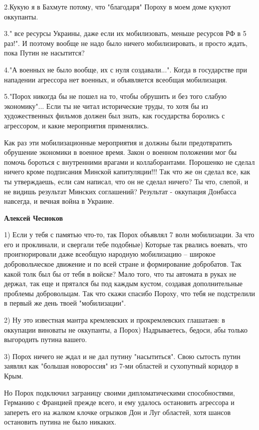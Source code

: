 \begin{itemize}
\begin{itemize}
2.Кукую я в Бахмуте потому, что "благодаря" Пороху в моем доме кукуют
оккупанты. 

3." все ресурсы Украины, даже если их мобилизовать, меньше ресурсов РФ в 5
раз!". И поэтому вообще не надо было ничего мобилизировать, и просто ждать,
пока Путин не насытится? 

4."А военных не было вообще, их с нуля создавали...". Когда в государстве при
нападении агрессора нет военных, и объявляется всеобщая мобилизация. 

5."Порох никогда бы не пошел на то, чтобы обрушить и без того слабую
экономику"... Если ты не читал исторические труды, то хотя бы из художественных
фильмов должен был знать, как государства боролись с агрессором, и какие
мероприятия применялись.

Как раз эти мобилизационные мероприятия и должны были предотвратить обрушение
экономики в военное время. Закон о военном положении мог бы помочь бороться с
внутренними врагами и коллаборантами. Порошенко не сделал ничего кроме
подписания Минской капитуляции!!! Так что же он сделал все, как ты утверждаешь,
если сам написал, что он не сделал ничего? Ты что, слепой, и не видишь
результат Минских соглашений? Результат - оккупация Донбасса навсегда, и вечная
война в Украине.

\textbf{Алексей Чесноков} 

1) Если у тебя с памятью что-то, так Порох объявлял 7 волн мобилизации. За что
его и проклинали, и свергали тебе подобные) Которые так рвались воевать, что
проигнорировали даже всеобщую народную мобилизацию – широкое добровольческое
движение и по всей стране и формирование добробатов. Так какой толк был бы от
тебя в войске? Мало того, что ты автомата в руках не держал, так еще и прятался
бы под каждым кустом, создавая дополнительные проблемы добровольцам. Так что
скажи спасибо Пороху, что тебя не подстрелили в первый же день твоей
"мобилизации".

2) Ну это известная мантра кремлевских и прокремлевских глашатаев: в оккупации
виноваты не оккупанты, а Порох) Надрываетесь, бедоси, абы только выгородить
путина вашего.

3) Порох ничего не ждал и не дал путину "насытиться". Свою сытость путин
заявлял как "большая новороссия" из 7-ми областей и сухопутный коридор в Крым.

Но Порох подключил заграницу своими дипломатическими способностями, Германию с
Францией прежде всего, и ему удалось остановить агрессора и запереть его на
жалком клочке огрызков Дон и Луг областей, хотя шансов остановить путина не
было никаких.


\end{itemize}
\end{itemize}

